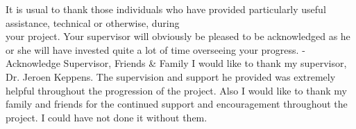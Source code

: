 It is usual to thank those individuals who have provided particularly useful assistance, technical or otherwise, during\\ your project. Your supervisor will obviously be pleased to be acknowledged as he or she will have invested quite a lot of time overseeing your progress.
-Acknowledge Supervisor, Friends \& Family
I would like to thank my supervisor, Dr. Jeroen Keppens. The supervision and support he provided was extremely helpful throughout the progression of the project. Also I would like to thank my family and friends for the continued support and encouragement throughout the project. I could have not done it without them.